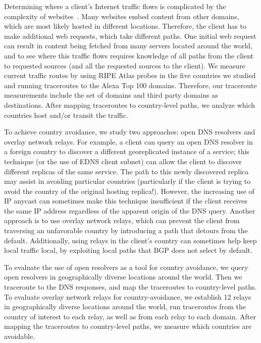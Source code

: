 Determining where a client's Internet traffic flows is complicated by
the complexity of websites~\cite{butkiewicz2011understanding}.  Many
websites embed content from other domains, which are most likely
hosted in different locations.  Therefore, the client has to make
additional web requests, which take different paths.  One initial web
request can result in content being fetched from many servers located
around the world, and to see where this traffic flows requires knowledge
of all paths from the client to requested sources (and all the requested
sources to the client).  We measure current traffic routes by using RIPE 
Atlas probes in the five countries we studied and running traceroutes to 
the Alexa Top 100 domains.  Therefore, our traceroute measurements include the 
set of domains and third party domains as destinations.  After mapping 
traceroutes to country-level paths, we analyze which 
countries host and/or transit the traffic.

To achieve country avoidance, we study two approaches: open DNS resolvers 
and overlay network relays. For
example, a client can query an open DNS resolver in a foreign country to
discover a different georeplicated instance of a service; this technique
(or the use of EDNS client subnet) can allow the client to discover
different replicas of the same service. The path to this newly
discovered replica may assist in avoiding particular countries
(particularly if the client is trying to avoid the country of the
original hosting replica!).  However, the increasing use of IP anycast can
sometimes make this technique insufficient if the client
receives the same IP address regardless of the apparent origin of the
DNS query.  Another approach is to use overlay network relays, which can
prevent the client from traversing an unfavorable country by introducing
a path that detours from the default. Additionally, using
relays in the client's country can sometimes help keep local traffic
local, by exploiting local paths that BGP does not select by default.

To evaluate the use of open resolvers as a tool for country avoidance, we
query open resolvers in geographically diverse locations around the world.  Then we traceroute 
to the DNS responses, and map the traceroutes to country-level paths.  To evaluate 
overlay network relays for country-avoidance, we establish 12 relays in geographically 
diverse locations around the world, run traceroutes from the country of interest to 
each relay, as well as from each relay to each domain.  After mapping 
the traceroutes to country-level paths, we measure which countries are 
avoidable.

